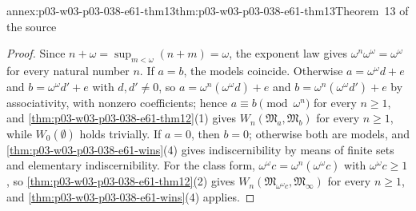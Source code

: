 \begin{annexitem}{annex:p03-w03-p03-038-e61-thm13}{thm:p03-w03-p03-038-e61-thm13}{Theorem~13 of the source}
\begin{proof}
Since \(n+\omega=\sup_{m<\omega}(n+m)=\omega\), the exponent law gives
\(\omega^n\omega^\omega=\omega^\omega\) for every natural number \(n\).
If \(a=b\), the models coincide. Otherwise \(a=\omega^\omega d+e\) and
\(b=\omega^\omega d'+e\) with \(d,d'\ne0\), so
\(a=\omega^n(\omega^\omega d)+e\) and \(b=\omega^n(\omega^\omega d')+e\)
by associativity, with nonzero coefficients; hence
\(a\equiv b\pmod{\omega^n}\) for every \(n\ge1\), and
\cref{thm:p03-w03-p03-038-e61-thm12}(1) gives
\(W_n(\mathfrak M_a,\mathfrak M_b)\) for every \(n\ge1\), while
\(W_0(\emptyset)\) holds trivially. If \(a=0\), then \(b=0\); otherwise
both are models, and \cref{thm:p03-w03-p03-038-e61-wins}(4) gives
indiscernibility by means of finite sets and elementary
indiscernibility. For the class form, \(\omega^\omega c=
\omega^n(\omega^\omega c)\) with \(\omega^\omega c\ge1\), so
\cref{thm:p03-w03-p03-038-e61-thm12}(2) gives
\(W_n(\mathfrak M_{\omega^\omega c},\mathfrak M_\infty)\) for every
\(n\ge1\), and \cref{thm:p03-w03-p03-038-e61-wins}(4) applies.
\end{proof}
\end{annexitem}

